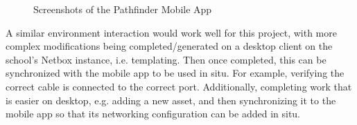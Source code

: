\documentclass [11pt,a4paper]{article}
\begin{document}
\begin{figure}[H]
    \centering
    \qquad
    \caption{Screenshots of the Pathfinder Mobile App}
    \label{fig:pathfinder_screenshots}
\end{figure}

A similar environment interaction would work well for this project, with more complex modifications being completed/generated on a desktop client on the school's Netbox instance, i.e. templating. Then once completed, this can be synchronized with the mobile app to be used in situ. For example, verifying the correct cable is connected to the correct port. Additionally, completing work that is easier on desktop, e.g. adding a new asset, and then synchronizing it to the mobile app so that its networking configuration can be added in situ. 
\end{document}
